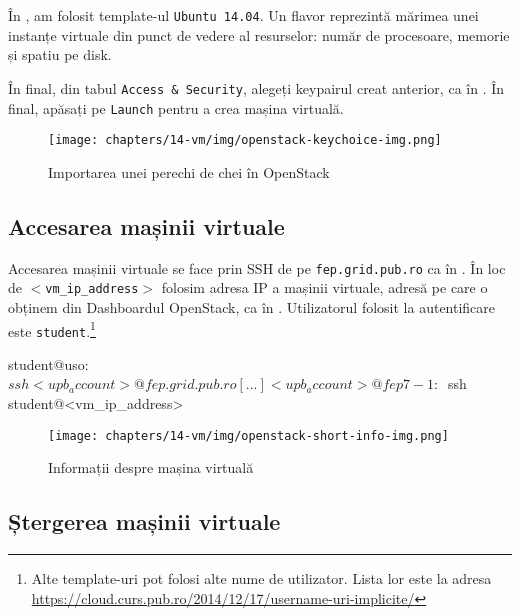 În , am folosit template-ul \texttt{Ubuntu 14.04}. Un flavor reprezintă
mărimea unei instanțe virtuale din punct de vedere al resurselor: număr de
procesoare, memorie și spatiu pe disk.

În final, din tabul \texttt{Access \& Security}, alegeți keypairul creat anterior, ca în . În final, apăsați pe \texttt{Launch} pentru a crea mașina virtuală.

\begin{figure}[!htbp]
	\centering
	\texttt{[image: chapters/14-vm/img/openstack-keychoice-img.png]}
	\caption{Importarea unei perechi de chei în OpenStack}
	\label{fig:vm:openstack-keychoice}
\end{figure}

\subsection{Accesarea mașinii virtuale}
\label{sec:vm:upb-openstack:vm-access}

Accesarea mașinii virtuale se face prin SSH de pe \texttt{fep.grid.pub.ro} ca în .
În loc de \texttt{$<$vm\_ip\_address$>$} folosim adresa IP a mașinii virtuale, adresă pe care o obținem din Dashboardul OpenStack, ca în .  Utilizatorul folosit la autentificare este \texttt{student}.\footnote{Alte template-uri pot folosi alte nume de utilizator. Lista lor este la adresa \url{https://cloud.curs.pub.ro/2014/12/17/username-uri-implicite/}}

\begin{screen}[caption={Accesarea mașinii virtuale prin intermediul fep.grid.pub.ro},label={lst:vm:access-vm}]
student@uso:~$ ssh <upb_account>@fep.grid.pub.ro
[...]
<upb_account>@fep7-1:~$ ssh student@<vm_ip_address>
\end{screen}

\begin{figure}[!htbp]
	\centering
	\texttt{[image: chapters/14-vm/img/openstack-short-info-img.png]}
	\caption{Informații despre mașina virtuală}
	\label{fig:vm:openstack-info}
\end{figure}

\subsection{Ștergerea mașinii virtuale}
\label{sec:vm:openstack:vm-delete}

